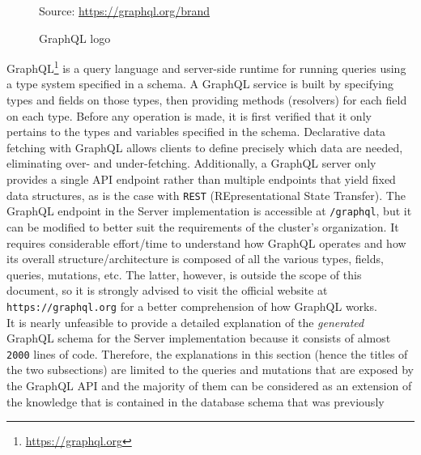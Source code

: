 \begin{figure} %
  \centering
  \def\stackalignment{r} %
  {\scriptsize \parbox[t]{\linewidth}{ Source: \url{https://graphql.org/brand}} }
  \caption{GraphQL logo}
\end{figure}

GraphQL\footnote{\url{https://graphql.org}} is a query language and server-side runtime
for running queries using a type system specified in a schema. A GraphQL service
is built by specifying types and fields on those types, then providing methods (resolvers)
for each field on each type. Before any operation is made, it is first verified that
it only pertains to the types and variables specified in the schema. Declarative
data fetching with GraphQL allows clients to define precisely which data are
needed, eliminating over- and under-fetching. Additionally, a GraphQL server
only provides a single API endpoint rather than multiple endpoints that yield
fixed data structures, as is the case with \texttt{REST} (REpresentational State
Transfer). The GraphQL endpoint in the Server implementation is accessible at \texttt{/graphql},
but it can be modified to better suit the requirements of the cluster's
organization. It requires considerable effort/time to understand how GraphQL operates
and how its overall structure/architecture is composed of all the various types,
fields, queries, mutations, etc. The latter, however, is outside the scope of
this document, so it is strongly advised to visit the official website at \texttt{https://graphql.org}
for a better comprehension of how GraphQL works. \\ %
It is nearly unfeasible to provide a detailed explanation of the \textit{generated}
GraphQL schema for the Server implementation because it consists of almost \texttt{2000}
lines of code. Therefore, the explanations in this section (hence the titles of the
two subsections) are limited to the queries and mutations that are exposed by
the GraphQL API and the majority of them can be considered as an extension of
the knowledge that is contained in the database schema that was previously
